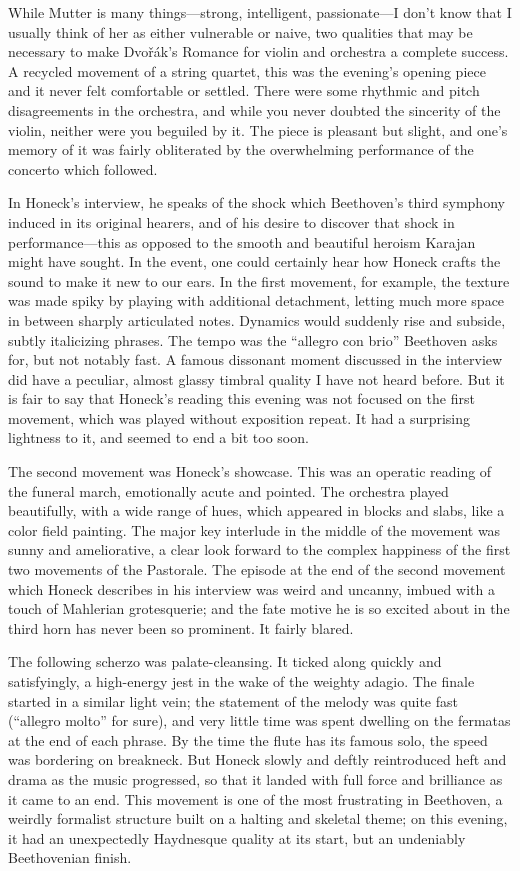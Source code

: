 While Mutter is many things—strong, intelligent, passionate—I don’t know that I usually think of her as either vulnerable or naive, two qualities that may be necessary to make Dvořák’s Romance for violin and orchestra a complete success. A recycled movement of a string quartet, this was the evening’s opening piece and it never felt comfortable or settled. There were some rhythmic and pitch disagreements in the orchestra, and while you never doubted the sincerity of the violin, neither were you beguiled by it. The piece is pleasant but slight, and one’s memory of it was fairly obliterated by the overwhelming performance of the concerto which followed.

In Honeck’s interview, he speaks of the shock which Beethoven’s third symphony induced in its original hearers, and of his desire to discover that shock in performance—this as opposed to the smooth and beautiful heroism Karajan might have sought. In the event, one could certainly hear how Honeck crafts the sound to make it new to our ears. In the first movement, for example, the texture was made spiky by playing with additional detachment, letting much more space in between sharply articulated notes. Dynamics would suddenly rise and subside, subtly italicizing phrases. The tempo was the “allegro con brio” Beethoven asks for, but not notably fast. A famous dissonant moment discussed in the interview did have a peculiar, almost glassy timbral quality I have not heard before. But it is fair to say that Honeck’s reading this evening was not focused on the first movement, which was played without exposition repeat. It had a surprising lightness to it, and seemed to end a bit too soon.

The second movement was Honeck’s showcase. This was an operatic reading of the funeral march, emotionally acute and pointed. The orchestra played beautifully, with a wide range of hues, which appeared in blocks and slabs, like a color field painting. The major key interlude in the middle of the movement was sunny and ameliorative, a clear look forward to the complex happiness of the first two movements of the Pastorale. The episode at the end of the second movement which Honeck describes in his interview was weird and uncanny, imbued with a touch of Mahlerian grotesquerie; and the fate motive he is so excited about in the third horn has never been so prominent. It fairly blared.

The following scherzo was palate-cleansing. It ticked along quickly and satisfyingly, a high-energy jest in the wake of the weighty adagio. The finale started in a similar light vein; the statement of the melody was quite fast (“allegro molto” for sure), and very little time was spent dwelling on the fermatas at the end of each phrase. By the time the flute has its famous solo, the speed was bordering on breakneck. But Honeck slowly and deftly reintroduced heft and drama as the music progressed, so that it landed with full force and brilliance as it came to an end. This movement is one of the most frustrating in Beethoven, a weirdly formalist structure built on a halting and skeletal theme; on this evening, it had an unexpectedly Haydnesque quality at its start, but an undeniably Beethovenian finish.

